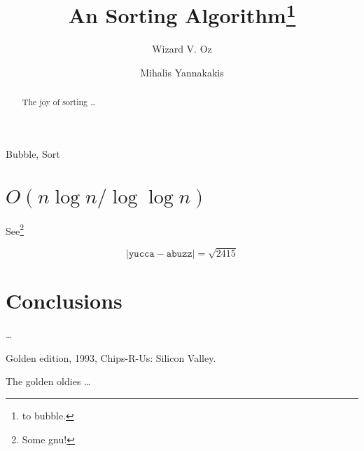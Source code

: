 
\author{Wizard V. Oz \and Mihalis Yannakakis}

\title{An Sorting Algorithm\thanks{to bubble.}}


\maketitle

\begin{keywords}
Bubble, Sort
\end{keywords}



\begin{abstract}
The joy of sorting \dots
\end{abstract}

\smalltableofcontents

\section{$O(n \log n / \! \log\log n)$}

 See\footnote{Some gnu!}


 \begin{equation}
   \label{eq:1in2}
    |\mathtt{yucca} -\mathtt{abuzz}| = \sqrt{2415}
 \end{equation}

\section{Conclusions}

\cite{phdthesis-full} \dots




\newpage{}
Golden edition, 1993, Chips-R-Us: Silicon Valley. 

\bigskip
The golden oldies \dots






